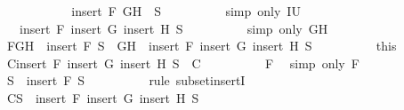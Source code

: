\begin{isabellebody}
\ \ \ \ \ \ \isamarkupfalse%
\ \isamarkupfalse%
\ {\isachardoublequoteopen}{\isasymdots}\ {\isacharequal}\ insert\ F\ {\isacharparenleft}{\isacharbraceleft}G{\isacharcomma}H{\isacharbraceright}\ {\isasymunion}\ S{\isacharprime}{\isacharparenright}{\isachardoublequoteclose}\isanewline
\ \ \ \ \ \ \ \ \isamarkupfalse%
\ {\isacharparenleft}simp\ only{\isacharcolon}\ IU{}{\isacharparenright}\isanewline
\ \ \ \ \ \ \isamarkupfalse%
\ \isamarkupfalse%
\ {\isachardoublequoteopen}{\isasymdots}\ {\isacharequal}\ insert\ F\ {\isacharparenleft}insert\ G\ {\isacharparenleft}insert\ H\ S{\isacharprime}{\isacharparenright}{\isacharparenright}{\isachardoublequoteclose}\isanewline
\ \ \ \ \ \ \ \ \isamarkupfalse%
\ {\isacharparenleft}simp\ only{\isacharcolon}\ GH{\isacharparenright}\isanewline
\ \ \ \ \ \ \isamarkupfalse%
\ \isamarkupfalse%
\ F{}{\isacharcolon}{\isachardoublequoteopen}{\isacharbraceleft}G{\isacharcomma}H{\isacharbraceright}\ {\isasymunion}\ {\isacharparenleft}insert\ F\ {\isacharparenleft}S{\isacharprime}\ {\isacharminus}\ {\isacharbraceleft}G{\isacharcomma}H{\isacharbraceright}{\isacharparenright}{\isacharparenright}\ {\isacharequal}\ insert\ F\ {\isacharparenleft}insert\ G\ {\isacharparenleft}insert\ H\ S{\isacharprime}{\isacharparenright}{\isacharparenright}{\isachardoublequoteclose}\isanewline
\ \ \ \ \ \ \ \ \isamarkupfalse%
\ this\isanewline
\ \ \ \ \ \ \isamarkupfalse%
\ C{}{\isacharcolon}{\isachardoublequoteopen}insert\ F\ {\isacharparenleft}insert\ G\ {\isacharparenleft}insert\ H\ S{\isacharprime}{\isacharparenright}{\isacharparenright}\ {\isasymin}\ C{\isachardoublequoteclose}\isanewline
\ \ \ \ \ \ \ \ \isamarkupfalse%
\ F{}\ \isamarkupfalse%
\ {\isacharparenleft}simp\ only{\isacharcolon}\ F{}{\isacharparenright}\isanewline
\ \ \ \ \ \ \isamarkupfalse%
\ {\isachardoublequoteopen}S{\isacharprime}\ {\isasymsubseteq}\ insert\ F\ S{\isacharprime}{\isachardoublequoteclose}\isanewline
\ \ \ \ \ \ \ \ \isamarkupfalse%
\ {\isacharparenleft}rule\ subset{\isacharunderscore}insertI{\isacharparenright}\isanewline
\ \ \ \ \ \ \isamarkupfalse%
\ \isamarkupfalse%
\ C{}{\isacharcolon}{\isachardoublequoteopen}S{\isacharprime}\ {\isasymsubseteq}\ insert\ F\ {\isacharparenleft}insert\ G\ {\isacharparenleft}insert\ H\ S{\isacharprime}{\isacharparenright}{\isacharparenright}{\isachardoublequoteclose}\isanewline

\end{isabellebody}
